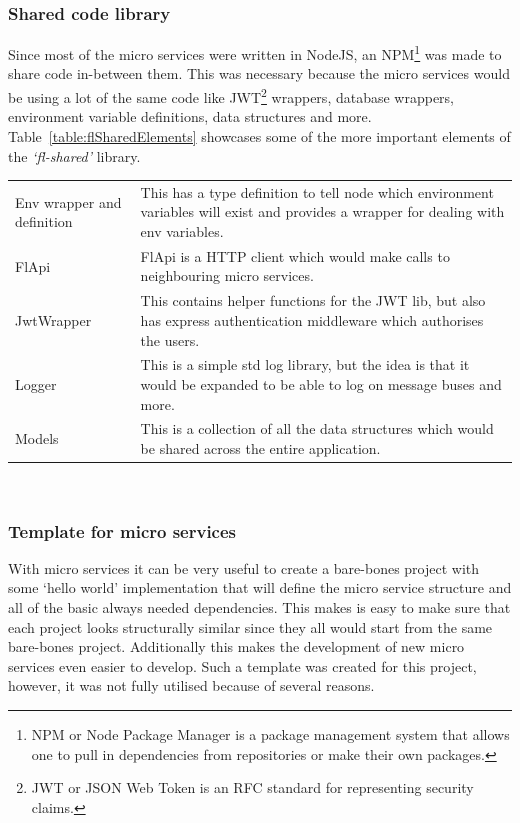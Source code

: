 \documentclass{article}
\newcommand{\vspaceconst}{-2ex}
\begin{document}
\begin{multicols}{2}
\subsubsection{Shared code library}
\vspace{\vspaceconst}
Since most of the micro services were written in NodeJS, an NPM\footnote{NPM or Node Package Manager is a package management system that allows one to pull in dependencies from repositories or make their own packages.} was made to share code in-between them. This was necessary because the micro services would be using a lot of the same code like JWT\footnote{JWT or JSON Web Token is an RFC standard for representing security claims\cite{jwtio}.} wrappers, database wrappers, environment variable definitions, data structures and more. Table~\ref{table:flSharedElements} showcases some of the more important elements of the \textit{`fl-shared'} library.\\

\begingroup
\centering
\begin{tabular}{p{2cm} p{5cm}}
  Env wrapper and definition & This has a type definition to tell node which environment variables will exist and provides a wrapper for dealing with env variables.\\
  FlApi & FlApi is a HTTP client which would make calls to neighbouring micro services.\\
  JwtWrapper & This contains helper functions for the JWT lib, but also has express authentication middleware which authorises the users.\\
  Logger & This is a simple std log library, but the idea is that it would be expanded to be able to log on message buses and more.\\
  Models & This is a collection of all the data structures which would be shared across the entire application.\\
\end{tabular}
~\label{table:flSharedElements}
\endgroup

\subsubsection{Template for micro services}
\vspace{\vspaceconst}
With micro services it can be very useful to create a bare-bones project with some `hello world' implementation that will define the micro service structure and all of the basic always needed dependencies. This makes is easy to make sure that each project looks structurally similar since they all would start from the same bare-bones project. Additionally this makes the development of new micro services even easier to develop. Such a template was created for this project, however, it was not fully utilised because of several reasons.


\end{multicols}
\end{document}
